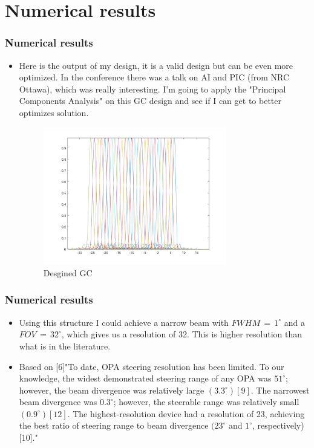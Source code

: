 \documentclass{beamer}
\begin{document}
\section{Numerical results} 
\begin{frame}
\frametitle{Numerical results}
\begin{itemize}
\item  Here is the output of my design, it is a valid design but can be even more optimized. In the conference there was a talk on AI and PIC (from NRC Ottawa), which was really interesting. I'm going to apply the "Principal Components Analysis" on this GC design and see if I can get to better optimizes solution.
\begin{figure}[H]
\includegraphics[width=8cm, height=6cm]{Figures/fov1335_1360}
\caption{Desgined GC}
\label{numerical results}
\end{figure}
\end{itemize}
\end{frame}
%
\begin{frame}
\frametitle{Numerical results}
\begin{itemize}
\item  Using this structure I could achieve a narrow beam with $FWHM \, = \, 1^{\circ}$ and a $FOV \,  = \, 32^{\circ}$, which gives us a resolution of 32. This is higher resolution than what is in the literature.
\item Based on [6]"To date, OPA steering resolution has been limited. To our knowledge, the widest demonstrated steering range of any OPA
was $51^{\circ}$; however, the beam divergence was relatively large $(3.3^{\circ})[9]$. The narrowest beam divergence was $0.3^{\circ}$; however, the steerable range was relatively small $(0.9^{\circ}) [12]$. The highest-resolution device had a resolution of 23, achieving the best ratio of steering range to beam divergence $(23^{\circ}$ and $1^{\circ}$, respectively) [10]."
\end{itemize}
\end{frame}
%
\end{document}

